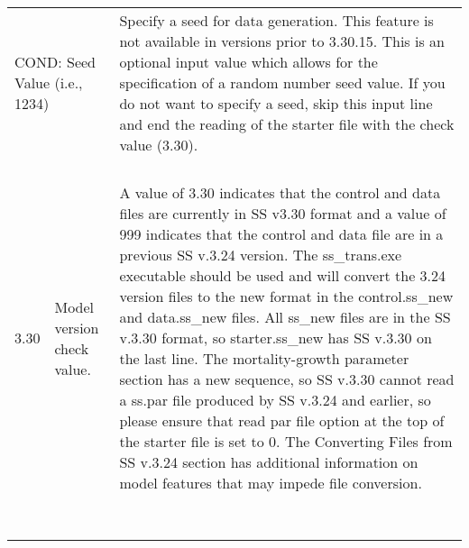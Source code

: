 {\begin{landscape}
\begin{longtable}{p{1.5cm} p{7.2cm} p{12.3cm}}
  \hline  
  \multicolumn{2}{l}{COND: Seed Value (i.e., 1234)}& \multirow{1}{1cm}[-0.25cm]{\parbox{12.5cm}{Specify a seed for data generation. This feature is not available in versions prior to 3.30.15. This is an optional input value which allows for the specification of a random number seed value.  If you do not want to specify a seed, skip this input line and end the reading of the starter file with the check value (3.30). }} \Tstrut\\
  & & \\ 
  & & \\
  & & \\ 
  & & \\
  
  \pagebreak
 \hypertarget{Convert}{3.30} & Model version check value. & \multirow{1}{1cm}[-0.25cm]{\parbox{12.5cm}{ A value of 3.30 indicates that the control and data files are currently in SS v3.30 format and a value of 999 indicates that the control and data file are in a previous SS v.3.24 version. The ss\_trans.exe executable should be used and will convert the 3.24 version files to the new format in the control.ss\_new and data.ss\_new files.  All ss\_new files are in the SS v.3.30 format, so starter.ss\_new has SS v.3.30 on the last line.  The mortality-growth parameter section has a new sequence, so SS v.3.30 cannot read a ss.par file produced by SS v.3.24 and earlier, so please ensure that read par file option at the top of the starter file is set to 0. The \hypertarget{ConvIssues}  {Converting Files from SS v.3.24} section has additional information on model features that may impede file conversion.}}\Tstrut\\
     & & \\  
     & & \\  
	 & & \\
     & & \\
   	 & & \\
     & & \\  
     & & \\  
     & & \\       
\end{longtable}
\end{landscape}
}
\restoregeometry





\pagebreak
